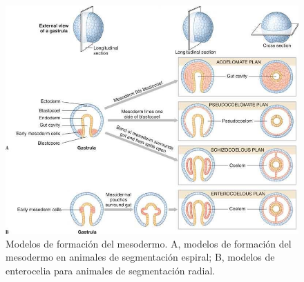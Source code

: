 \begin{figure}[H]
    \centering
    \includegraphics[width=\columnwidth]{A.imagenes/ACV-ANATANIM-Mesodermo.jpeg}    
    \caption[Modelos de formación del mesodermo]{Modelos de formación del mesodermo. A, modelos de formación del mesodermo en animales de segmentación espiral; B, modelos de enterocelia para animales de segmentación radial.}
\end{figure}
